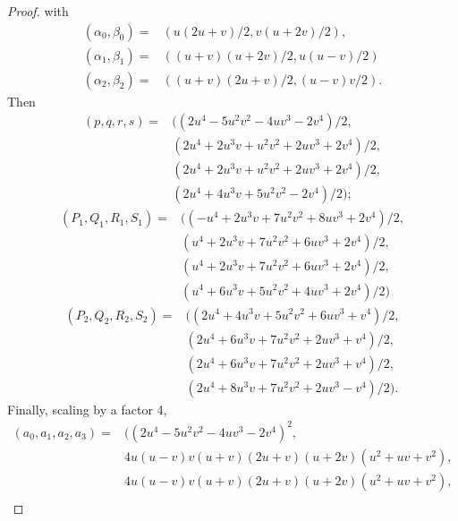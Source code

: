 \documentclass[10pt,a4paper]{amsart}
\begin{document}
\begin{proof}
with 
\begin{align*}
	(\alpha_0,\beta_0) = & (u(2u+v)/2, v(u+2v)/2), \\
	(\alpha_1,\beta_1) = & ((u+v)(u+2v)/2, u(u-v)/2) \\
	(\alpha_2,\beta_2) = & ((u+v)(2u+v)/2, (u-v)v/2).
\end{align*}
Then
\begin{align*}
	(p,q,r,s) = & ((2u^4 - 5u^2v^2 - 4uv^3 - 2v^4)/2, \\
	& (2u^4 + 2u^3v + u^2v^2 + 2uv^3 + 2v^4)/2, \\
	& (2u^4 + 2u^3v + u^2v^2 + 2uv^3 + 2v^4)/2, \\
	& (2u^4 + 4u^3v + 5u^2v^2 - 2v^4)/2);
\end{align*}
\begin{align*}
	(P_1,Q_1,R_1,S_1) = & ((-u^4 + 2u^3v + 7u^2v^2 + 8uv^3 + 2v^4)/2, \\
	& (u^4 + 2u^3v + 7u^2v^2 + 6uv^3 + 2v^4)/2,  \\
	& (u^4 + 2u^3v + 7u^2v^2 + 6uv^3 + 2v^4)/2, \\
	& (u^4 + 6u^3v + 5u^2v^2 + 4uv^3 + 2v^4)/2)
\end{align*}
\begin{align*}
	(P_2,Q_2,R_2,S_2) = & ((2u^4 + 4u^3v + 5u^2v^2 + 6uv^3 + v^4)/2, \\
	& (2u^4 + 6u^3v + 7u^2v^2 + 2uv^3 + v^4)/2, \\
	& (2u^4 + 6u^3v + 7u^2v^2 + 2uv^3 + v^4)/2, \\
	& (2u^4 + 8u^3v + 7u^2v^2 + 2uv^3 - v^4)/2).
\end{align*}
Finally, scaling by a factor 4, 
\begin{align*}
	(a_0,a_1,a_2,a_3) = &  ( (2u^4 - 5u^2v^2 - 4uv^3 - 2v^4)^2, \\
	& 4u(u - v)v(u + v)(2u + v)(u + 2v)(u^2 + uv + v^2), \\
	& 4u(u - v)v(u + v)(2u + v)(u + 2v)(u^2 + uv + v^2), \\

\end{align*}
\end{proof}
\end{document}
